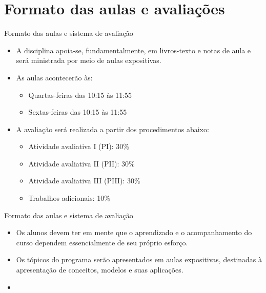 \documentclass[10pt]{beamer}
\begin{document}
\section{Formato das aulas e avaliações}
\begin{frame}{Formato das aulas e sistema de avaliação}
    \begin{itemize}
        \item A disciplina apoia-se, fundamentalmente, em livros-texto e notas de aula e será ministrada por meio de aulas expositivas.\bigskip

        \item As aulas acontecerão às:\medskip
              \begin{itemize}
                  \item Quartas-feiras das 10:15 às 11:55
                  \item Sextas-feiras das 10:15 às 11:55\bigskip
              \end{itemize}

        \item A avaliação será realizada a partir dos procedimentos abaixo:\medskip
              \begin{itemize}
                  \item Atividade avaliativa I (PI): 30\%
                  \item Atividade avaliativa II (PII): 30\%
                  \item Atividade avaliativa III (PIII): 30\%
                  \item Trabalhos adicionais: 10\%
              \end{itemize}
    \end{itemize}
\end{frame}

\begin{frame}{Formato das aulas e sistema de avaliação}
    \begin{itemize}
        \item Os alunos devem ter em mente que o aprendizado e o acompanhamento do curso dependem essencialmente de seu próprio esforço.\bigskip

        \item Os tópicos do programa serão apresentados em aulas expositivas, destinadas à apresentação de conceitos, modelos e suas aplicações.\bigskip

        \item[\emoji{warning}] 
    \end{itemize}
\end{frame}
\end{document}
